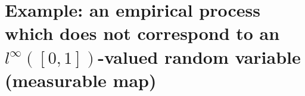 

\section{Example: an empirical process
which does not correspond to
an $l^{\infty}([0,1])$-valued random variable (measurable map)}
\setcounter{theorem}{0}
\setcounter{equation}{0}


\renewcommand{\theenumi}{\roman{enumi}}
\renewcommand{\labelenumi}{\textnormal{(\theenumi)}$\;\;$}


